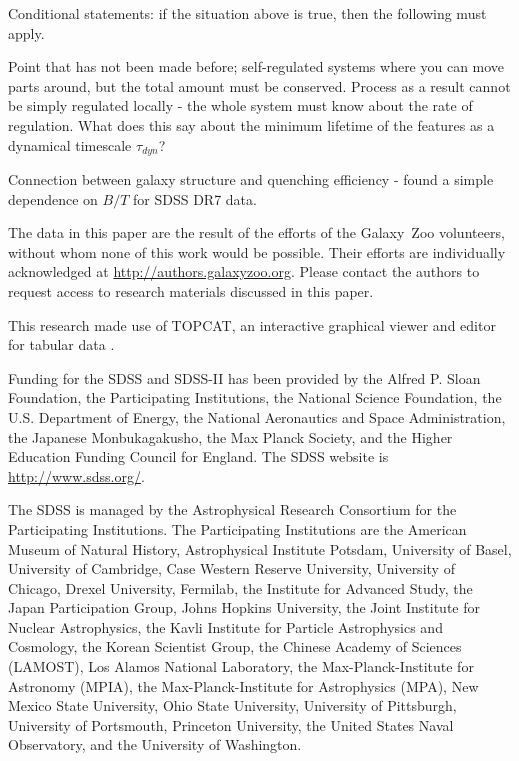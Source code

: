 \documentclass{emulateapj}
\begin{document}
Conditional statements: if the situation above is true, then the following must apply. 

Point that has not been made before; self-regulated systems where you can move parts around, but the total amount must be conserved. Process as a result cannot be simply regulated locally - the whole system must know about the rate of regulation. What does this say about the minimum lifetime of the features as a dynamical timescale $\tau_{dyn}$? 

Connection between galaxy structure and quenching efficiency - \citet{oma14} found a simple dependence on $B/T$ for SDSS DR7 data. 


\acknowledgments

The data in this paper are the result of the efforts of the Galaxy~Zoo volunteers, without whom none of this work would be possible. Their efforts are individually acknowledged at \url{http://authors.galaxyzoo.org}. Please contact the authors to request access to research materials discussed in this paper. 

This research made use of TOPCAT, an interactive graphical viewer and editor for tabular data \citep{tay05}. 

Funding for the SDSS and SDSS-II has been provided by the Alfred P. Sloan Foundation, the Participating Institutions, the National Science Foundation, the U.S. Department of Energy, the National Aeronautics and Space Administration, the Japanese Monbukagakusho, the Max Planck Society, and the Higher Education Funding Council for England. The SDSS website is \url{http://www.sdss.org/}.

The SDSS is managed by the Astrophysical Research Consortium for the Participating Institutions. The Participating Institutions are the American Museum of Natural History, Astrophysical Institute Potsdam, University of Basel, University of Cambridge, Case Western Reserve University, University of Chicago, Drexel University, Fermilab, the Institute for Advanced Study, the Japan Participation Group, Johns Hopkins University, the Joint Institute for Nuclear Astrophysics, the Kavli Institute for Particle Astrophysics and Cosmology, the Korean Scientist Group, the Chinese Academy of Sciences (LAMOST), Los Alamos National Laboratory, the Max-Planck-Institute for Astronomy (MPIA), the Max-Planck-Institute for Astrophysics (MPA), New Mexico State University, Ohio State University, University of Pittsburgh, University of Portsmouth, Princeton University, the United States Naval Observatory, and the University of Washington.

\clearpage



\end{document}
